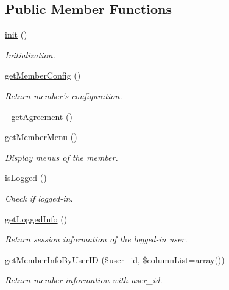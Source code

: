 \subsection*{Public Member Functions}
\begin{DoxyCompactItemize}
\item 
\hyperlink{classmemberModel_ae809c0b0f1c10e0352ad65e7df2a1ac9}{init} ()
\begin{DoxyCompactList}\small\item\em Initialization. \end{DoxyCompactList}\item 
\hyperlink{classmemberModel_a063f34e0a57f8e1c2737318ecd6db8c7}{get\-Member\-Config} ()
\begin{DoxyCompactList}\small\item\em Return member's configuration. \end{DoxyCompactList}\item 
\hyperlink{classmemberModel_a77fb03f9f26568731dfad78b0b1572dd}{\-\_\-get\-Agreement} ()
\item 
\hyperlink{classmemberModel_acd26b1539d27466b84d16d2be10f82cd}{get\-Member\-Menu} ()
\begin{DoxyCompactList}\small\item\em Display menus of the member. \end{DoxyCompactList}\item 
\hyperlink{classmemberModel_a1cae2bd4d961fc6412281111a1565a3d}{is\-Logged} ()
\begin{DoxyCompactList}\small\item\em Check if logged-\/in. \end{DoxyCompactList}\item 
\hyperlink{classmemberModel_a80179b6ef63e1917514c098df24c6e93}{get\-Logged\-Info} ()
\begin{DoxyCompactList}\small\item\em Return session information of the logged-\/in user. \end{DoxyCompactList}\item 
\hyperlink{classmemberModel_a51229368446fed60d67d3349a0ac305c}{get\-Member\-Info\-By\-User\-I\-D} (\$\hyperlink{ko_8install_8php_a74f1a394389d774e5b4cd5d1d15413f7}{user\-\_\-id}, \$column\-List=array())
\begin{DoxyCompactList}\small\item\em Return member information with user\-\_\-id. \end{DoxyCompactList}\item 

\end{DoxyCompactItemize}
